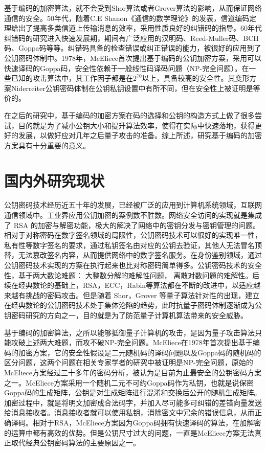 基于编码的加密算法，就不会受到Shor算法或者Grover算法的影响，从而保证网络通信的安全。50年代，随着C.E Shanon《通信的数学理论》的发表，信道编码定理给出了提高多类信道上传输消息的效率，采用性质良好的纠错码的指导。60年代纠错码的研究进入快速发展期，期间有广泛应用的汉明码、Reed-Muller码、BCH码、Goppa码等等。纠错码具备的检查错误或纠正错误的能力，被很好的应用到了公钥密码体制中。1978年，McEliece首次提出基于编码的公钥加密方案，采用可以快速译码的Goppa码，安全性依赖于一般线性码译码问题（NP-完全问题）。在一些已知的攻击算法中，其工作因子都是在$2 ^ {70}$以上，具备较高的安全性。其变形方案Niderreiter公钥密码体制在公钥私钥设置中有所不同，但在安全性上被证明是等价的。

在之后的研究中，基于编码的加密方案在码的选择和公钥的构造方式上做了很多尝试，目的就是为了减小公钥大小和提升算法效率，使得在实际中快速落地，获得更好的发展，以做好应对几年之后量子攻击的准备。综上所述，研究基于编码的加密方案具有十分重要的意义。

\section{国内外研究现状}
公钥密码技术经历近五十年的发展，已经被广泛的应用到计算机系统领域，互联网通信领域中。工业界应用公钥加密的案例数不胜数。网络安全访问的实现就是集成了 RSA 的加密与解密功能，极大的解决了网络中的密钥分发与密钥管理的问题。相对于对称密码在数字签名领域的局限性，公钥密码技术可以很好的实现唯一性，私有性等数字签名的要求，通过私钥签名由对应的公钥去验证，其他人无法冒名顶替，无法篡改签名内容，从而提供网络中的数字签名服务。在身份鉴别领域，通过公钥密码技术实现的方案在执行起来也比对称密码简单得多。公钥密码技术的安全性，基于两大数论难题： 大整数分解的难解性问题， 离散对数问题的难解性。后续在经典数论的基础上，RSA，ECC，Rabin等算法都在不断的改进中，以适应越来越有挑战的密码攻击。但是随着 Shor，Grover 等量子算法针对性的出现，建立在经典数论的公钥密码技术处于集体沦陷的趋势，此时抗量子密码体制逐渐成为公钥密码研究的方向之一，目的就是为了防范量子计算机算法带来的安全威胁。

基于编码的加密算法，之所以能够抵御量子计算机的攻击，是因为量子攻击算法只能攻破上述两大难题，而攻不破{NP-}完全问题。McEliece在1978年首次提出基于编码的加密方案，它的安全性假设是二元随机码的译码问题以及Goppa码的随机码的区分问题，这两个问题在相关专家学者的研究中被证明是{NP-}完全问题，原始的McEliece方案经过三十多年的密码分析，被认为是目前为止最安全的公钥密码方案之一。McEliece方案采用一个随机二元不可约Goppa码作为私钥，也就是说保密Goppa码的生成矩阵，公钥是对生成矩阵进行混淆和交换后公开的随机生成矩阵。加密过程中，就是将明文加密成合法码字，并加入尽可能多可纠错的差错向量发送给消息接收者。消息接收者就可以使用私钥，消除密文中冗余的错误信息，从而正确译码。相对于RSA，McEliece方案因为Goppa码拥有快速译码的算法，在加解密的运算中都有高效的优势。但是公钥尺寸过大的问题，一直是McEliece方案无法真正取代经典公钥密码算法的主要原因之一。

